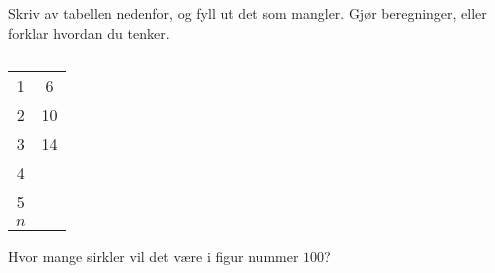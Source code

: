 \begin{oppgaver}
     Skriv av tabellen nedenfor, og fyll ut det som mangler. Gjør
    beregninger, eller forklar hvordan du tenker.
\end{oppgaver}

\begin{table}[H]
  \centering
  \caption{}
  \begin{tabular}{| S[table-format=1.0] | S[table-format=2.0] |}
    1   &  6 \\
    2   & 10 \\
    3   & 14 \\
    4   &    \\
    5   &    \\
    {$n$} &    \\ \hline
  \end{tabular}
  \label{tab:del-1-oppgave-1.8}
\end{table}

\begin{oppgaver}
     Hvor mange sirkler vil det være i figur nummer $100$?
\end{oppgaver}

